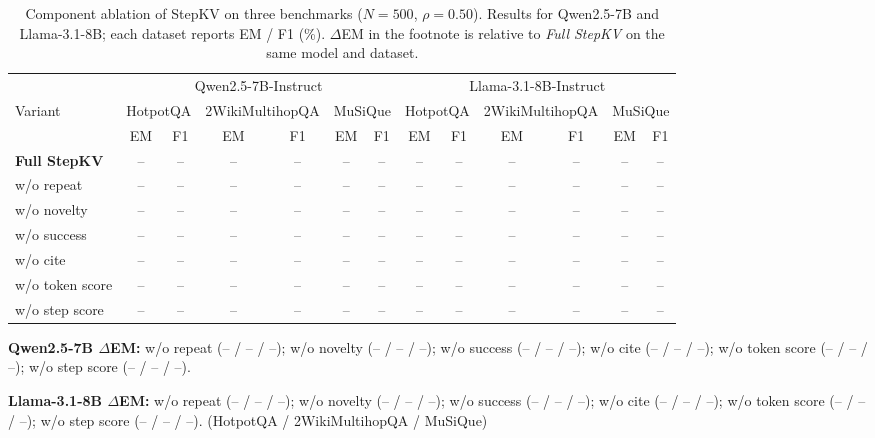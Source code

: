 %

\begin{table}[t]
\centering
\footnotesize
\setlength{\tabcolsep}{3.5pt}
\caption{Component ablation of StepKV on three benchmarks ($N=500$, $\rho=0.50$).
Results for Qwen2.5-7B and Llama-3.1-8B; each dataset reports EM / F1 (\%).
$\Delta$EM in the footnote is relative to \textit{Full StepKV} on the same model and dataset.}
\label{tab:stepkv-ablation-two-models}
\begin{tabular}{lcccccccccccc}
\toprule
& \multicolumn{6}{c}{Qwen2.5-7B-Instruct} & \multicolumn{6}{c}{Llama-3.1-8B-Instruct} \\
\cmidrule(lr){2-7} \cmidrule(lr){8-13}
Variant
& \multicolumn{2}{c}{HotpotQA} & \multicolumn{2}{c}{2WikiMultihopQA} & \multicolumn{2}{c}{MuSiQue}
& \multicolumn{2}{c}{HotpotQA} & \multicolumn{2}{c}{2WikiMultihopQA} & \multicolumn{2}{c}{MuSiQue} \\
& EM & F1 & EM & F1 & EM & F1 & EM & F1 & EM & F1 & EM & F1 \\
\midrule
\textbf{Full StepKV} & -- & -- & -- & -- & -- & -- & -- & -- & -- & -- & -- & -- \\
w/o repeat           & -- & -- & -- & -- & -- & -- & -- & -- & -- & -- & -- & -- \\
w/o novelty          & -- & -- & -- & -- & -- & -- & -- & -- & -- & -- & -- & -- \\
w/o success          & -- & -- & -- & -- & -- & -- & -- & -- & -- & -- & -- & -- \\
w/o cite             & -- & -- & -- & -- & -- & -- & -- & -- & -- & -- & -- & -- \\
w/o token score      & -- & -- & -- & -- & -- & -- & -- & -- & -- & -- & -- & -- \\
w/o step score       & -- & -- & -- & -- & -- & -- & -- & -- & -- & -- & -- & -- \\
\bottomrule
\end{tabular}

\vspace{0.35em}
{\footnotesize
\textbf{Qwen2.5-7B $\Delta$EM:}
w/o repeat (-- / -- / --);
w/o novelty (-- / -- / --);
w/o success (-- / -- / --);
w/o cite (-- / -- / --);
w/o token score (-- / -- / --);
w/o step score (-- / -- / --).
}

\vspace{0.25em}
{\footnotesize
\textbf{Llama-3.1-8B $\Delta$EM:}
w/o repeat (-- / -- / --);
w/o novelty (-- / -- / --);
w/o success (-- / -- / --);
w/o cite (-- / -- / --);
w/o token score (-- / -- / --);
w/o step score (-- / -- / --).
(HotpotQA / 2WikiMultihopQA / MuSiQue)
}
\end{table}
